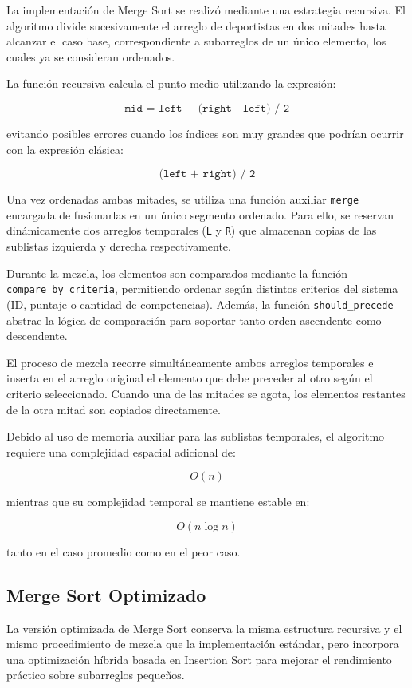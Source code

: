 La implementación de Merge Sort se realizó mediante una estrategia recursiva. El algoritmo divide sucesivamente el arreglo de deportistas en dos mitades hasta alcanzar el caso base, correspondiente a subarreglos de un único elemento, los cuales ya se consideran ordenados.

La función recursiva calcula el punto medio utilizando la expresión:

\[
\texttt{mid = left + (right - left) / 2}
\]

evitando posibles errores cuando los índices son muy grandes que podrían ocurrir con la expresión clásica:

\[
\texttt{(left + right) / 2}
\]

Una vez ordenadas ambas mitades, se utiliza una función auxiliar \texttt{merge} encargada de fusionarlas en un único segmento ordenado. Para ello, se reservan dinámicamente dos arreglos temporales (\texttt{L} y \texttt{R}) que almacenan copias de las sublistas izquierda y derecha respectivamente.

Durante la mezcla, los elementos son comparados mediante la función \texttt{compare\_by\_criteria}, permitiendo ordenar según distintos criterios del sistema (ID, puntaje o cantidad de competencias). Además, la función \texttt{should\_precede} abstrae la lógica de comparación para soportar tanto orden ascendente como descendente.

El proceso de mezcla recorre simultáneamente ambos arreglos temporales e inserta en el arreglo original el elemento que debe preceder al otro según el criterio seleccionado. Cuando una de las mitades se agota, los elementos restantes de la otra mitad son copiados directamente.

Debido al uso de memoria auxiliar para las sublistas temporales, el algoritmo requiere una complejidad espacial adicional de:

\[
O(n)
\]

mientras que su complejidad temporal se mantiene estable en:

\[
O(n \log n)
\]

tanto en el caso promedio como en el peor caso.

\subsection{Merge Sort Optimizado}

La versión optimizada de Merge Sort conserva la misma estructura recursiva y el mismo procedimiento de mezcla que la implementación estándar, pero incorpora una optimización híbrida basada en Insertion Sort para mejorar el rendimiento práctico sobre subarreglos pequeños.

